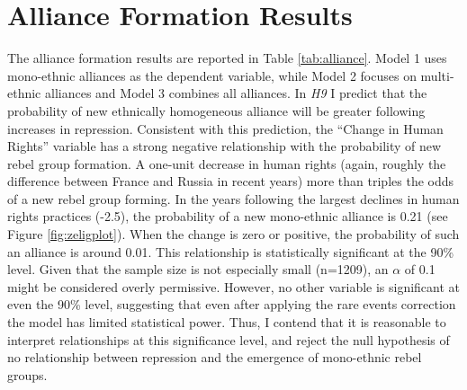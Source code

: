 \documentclass[12pt,]{book}
\theoremstyle{definition}
\theoremstyle{definition}
\theoremstyle{remark}
\begin{document}
\section{Alliance Formation Results}\label{alliance-formation-results}

The alliance formation results are reported in Table \ref{tab:alliance}.
Model 1 uses mono-ethnic alliances as the dependent variable, while
Model 2 focuses on multi-ethnic alliances and Model 3 combines all
alliances. In \emph{H9} I predict that the probability of new ethnically
homogeneous alliance will be greater following increases in repression.
Consistent with this prediction, the ``Change in Human Rights'' variable
has a strong negative relationship with the probability of new rebel
group formation. A one-unit decrease in human rights (again, roughly the
difference between France and Russia in recent years) more than triples
the odds of a new rebel group forming. In the years following the
largest declines in human rights practices (-2.5), the probability of a
new mono-ethnic alliance is 0.21 (see Figure \ref{fig:zeligplot}). When
the change is zero or positive, the probability of such an alliance is
around 0.01. This relationship is statistically significant at the 90\%
level. Given that the sample size is not especially small (n=1209), an
\(\alpha\) of 0.1 might be considered overly permissive. However, no
other variable is significant at even the 90\% level, suggesting that
even after applying the rare events correction the model has limited
statistical power. Thus, I contend that it is reasonable to interpret
relationships at this significance level, and reject the null hypothesis
of no relationship between repression and the emergence of mono-ethnic
rebel groups.
\end{document}
